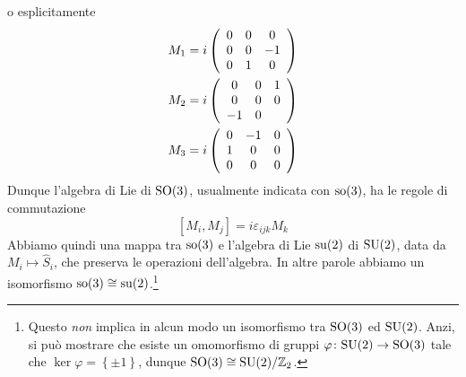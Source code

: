 \documentclass[a4paper, 11pt]{article}
\begin{document}
o esplicitamente
\begin{align*}
	M_1&=i\left(\begin{array}{c c c}
		0&0&0\\0&0&-1\\0&1&0
	\end{array}\right)\\
	M_2&=i\left(\begin{array}{c c c}
		0&0&1\\0&0&0\\-1&0&
	\end{array}\right)\\
	M_3&=i\left(\begin{array}{c c c}
		0&-1&0\\1&0&0\\0&0&0
	\end{array}\right)
\end{align*}
Dunque l'algebra di Lie di $\mathrm{SO}(3)$, usualmente indicata con $\mathrm{so}(3)$, ha le regole di commutazione
\[[M_i,M_j]=i\varepsilon_{ijk}M_k\]
Abbiamo quindi una mappa tra $\mathrm{so}(3)$ e l'algebra di Lie $\mathrm{su}(2)$ di $\mathrm{SU}(2)$, data da $M_i\mapsto\hat{S}_i$, che preserva le operazioni dell'algebra. In altre parole abbiamo un isomorfismo $\mathrm{so}(3)\cong\mathrm{su}(2)$.\footnote{Questo \emph{non} implica in alcun modo un isomorfismo tra $\mathrm{SO}(3)$ ed $\mathrm{SU}(2)$. Anzi, si può mostrare che esiste un omomorfismo di gruppi $\varphi\colon\mathrm{SU}(2)\to\mathrm{SO}(3)$ tale che $\ker\varphi=\left\{\pm1\right\}$, dunque $\mathrm{SO}(3)\cong\mathrm{SU}(2)/\mathbb{Z}_2$.}
\end{document}
